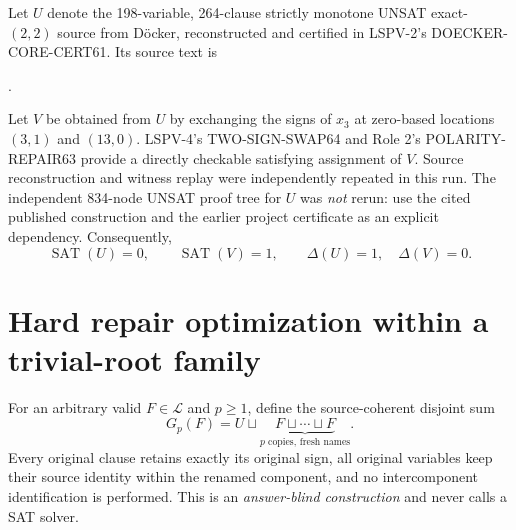 \documentclass[11pt]{article}
\begin{document}
Let \(U\) denote the 198-variable, 264-clause strictly monotone UNSAT exact-\((2,2)\) source from D\"ocker, reconstructed and certified in LSPV-2's DOECKER-CORE-CERT61. Its source text is
\begin{center}\small
{}.
\end{center}
Let \(V\) be obtained from \(U\) by exchanging the signs of \(x_3\) at zero-based locations \((3,1)\) and \((13,0)\). LSPV-4's TWO-SIGN-SWAP64 and Role 2's POLARITY-REPAIR63 provide a directly checkable satisfying assignment of \(V\). Source reconstruction and witness replay were independently repeated in this run. The independent 834-node UNSAT proof tree for \(U\) was \emph{not} rerun: use the cited published construction and the earlier project certificate as an explicit dependency. Consequently,
\[
\operatorname{SAT}(U)=0,\qquad
\operatorname{SAT}(V)=1,\qquad
\boxed{\Delta(U)=1,\quad\Delta(V)=0}.
\tag{4}
\]

\section{Hard repair optimization within a trivial-root family}
For an arbitrary valid \(F\in\mathcal L\) and \(p\ge1\), define the source-coherent disjoint sum
\[
G_p(F)=U\sqcup\underbrace{F\sqcup\cdots\sqcup F}_{p\text{ copies, fresh names}}.
\tag{5}
\]
Every original clause retains exactly its original sign, all original variables keep their source identity within the renamed component, and no intercomponent identification is performed. This is an \emph{answer-blind construction} and never calls a SAT solver.
\end{document}
